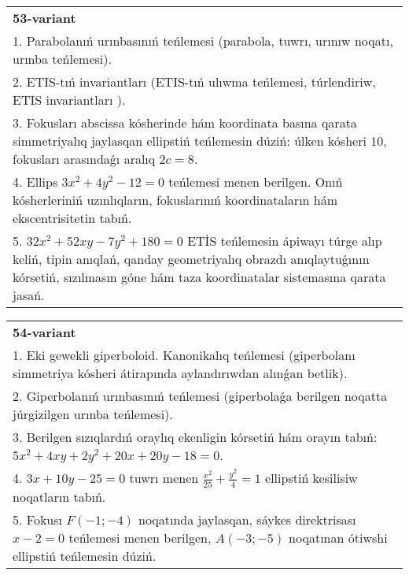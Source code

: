 \documentclass{article}
\begin{document}
\begin{tabular}{m{17cm}}
\textbf{53-variant}\\
1. Parabolanıń urınbasınıń teńlemesi (parabola, tuwrı, urınıw noqatı, urınba teńlemesi).\\

2. ETIS-tıń invariantları (ETIS-tıń ulıwma teńlemesi, túrlendiriw, ETIS invariantları ).\\

3. Fokusları abscissa kósherinde hám koordinata basına qarata simmetriyalıq jaylasqan ellipstiń teńlemesin dúziń: úlken kósheri $10$, fokusları arasındaǵı aralıq $2 c=8$.\\

4. Ellips $3x^{2} + 4y^{2} - 12 = 0$ teńlemesi menen berilgen. Onıń kósherleriniń uzınlıqların, fokuslarınıń koordinataların hám ekscentrisitetin tabıń.  \\

5. $32x^{2} + 52xy - 7y^{2} + 180 = 0$ ETİS teńlemesin ápiwayı túrge alıp keliń, tipin anıqlań, qanday geometriyalıq obrazdı anıqlaytuǵının kórsetiń, sızılmasın góne hám taza koordinatalar sistemasına qarata jasań.  
\end{tabular}
\vspace{1cm}


\begin{tabular}{m{17cm}}
\textbf{54-variant}\\
1. Eki gewekli giperboloid. Kanonikalıq teńlemesi (giperbolanı simmetriya kósheri átirapında aylandırıwdan alınǵan betlik).\\

2. Giperbolanıń urınbasınıń teńlemesi (giperbolaǵa berilgen noqatta júrgizilgen urınba teńlemesi).\\

3. Berilgen sızıqlardıń oraylıq ekenligin kórsetiń hám orayın tabıń: $5 x^{2}+4 xy+2 y^{2}+20 x+20 y-18=0$.\\

4. $3x + 10y - 25 = 0$ tuwrı menen $\frac{x^{2}}{25} + \frac{y^{2}}{4} = 1$ ellipstiń kesilisiw noqatların tabıń.\\

5. Fokusı $F( - 1; - 4)$ noqatında jaylasqan, sáykes direktrisası $x - 2 = 0$ teńlemesi menen berilgen, $A( - 3; - 5)$ noqatınan ótiwshi ellipstiń teńlemesin dúziń.  
\end{tabular}
\vspace{1cm}
\end{document}
